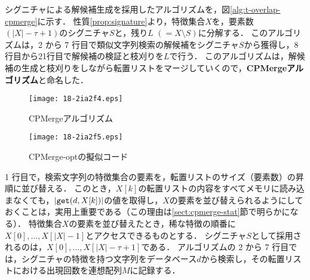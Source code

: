 \documentclass[japanese]{jnlp_JS2.0}
\begin{document}
シグニチャによる解候補生成を採用したアルゴリズムを，図\ref{alg:t-overlap-cpmerge}に示す．
性質\ref{prop:signature}より，特徴集合$X$を，要素数$(|X| - \tau + 1)$のシグニチャ$S$と，残り$L$ $(= X \setminus S)$に分解する．
このアルゴリズムは，2 から 7 行目で類似文字列検索の解候補をシグニチャ$S$から獲得し，8 行目から21行目で解候補の検証と枝刈りを$L$で行う．
このアルゴリズムは，解候補の生成と枝刈りをしながら転置リストをマージしていくので，{\bf CPMergeアルゴリズム}と命名した．

\begin{figure}[b]
\begin{minipage}{187pt}
\texttt{[image: 18-2ia2f4.eps]}
\caption{CPMergeアルゴリズム}
\label{alg:t-overlap-cpmerge}
\vspace{74pt}
\end{minipage}
\hfill
\begin{minipage}{231pt}
\texttt{[image: 18-2ia2f5.eps]}
\caption{CPMerge-optの擬似コード}
\label{alg:t-overlap-cpmerge-post}
\end{minipage}
\end{figure}

1 行目で，検索文字列の特徴集合の要素を，転置リストのサイズ（要素数）の昇順に並び替える．
このとき，$X[k]$の転置リストの内容をすべてメモリに読み込まなくても，$|\mbox{\tt get}(d, X[k])|$の値を取得し，$X$の要素を並び替えられるようにしておくことは，実用上重要である（この理由は\ref{sect:cpmerge-stat}節で明らかになる）．
特徴集合$X$の要素を並び替えたとき，稀な特徴の順番に$X[0], \ldots , X[|X|-1]$とアクセスできるものとする．
シグニチャ$S$として採用されるのは，$X[0], \ldots , X[|X| - \tau + 1]$である．
アルゴリズムの 2 から 7 行目では，シグニチャの特徴を持つ文字列をデータベース$d$から検索し，その転置リストにおける出現回数を連想配列$M$に記録する．
\end{document}
